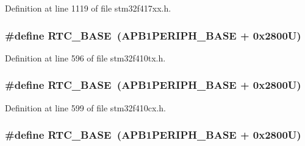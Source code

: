 Definition at line 1119 of file stm32f417xx.\+h.

\subsubsection[{\texorpdfstring{R\+T\+C\+\_\+\+B\+A\+SE}{RTC_BASE}}]{\setlength{\rightskip}{0pt plus 5cm}\#define R\+T\+C\+\_\+\+B\+A\+SE~({\bf A\+P\+B1\+P\+E\+R\+I\+P\+H\+\_\+\+B\+A\+SE} + 0x2800\+U)}\hypertarget{group___peripheral__registers__structures_ga4265e665d56225412e57a61d87417022}{}\label{group___peripheral__registers__structures_ga4265e665d56225412e57a61d87417022}


Definition at line 596 of file stm32f410tx.\+h.

\subsubsection[{\texorpdfstring{R\+T\+C\+\_\+\+B\+A\+SE}{RTC_BASE}}]{\setlength{\rightskip}{0pt plus 5cm}\#define R\+T\+C\+\_\+\+B\+A\+SE~({\bf A\+P\+B1\+P\+E\+R\+I\+P\+H\+\_\+\+B\+A\+SE} + 0x2800\+U)}\hypertarget{group___peripheral__registers__structures_ga4265e665d56225412e57a61d87417022}{}\label{group___peripheral__registers__structures_ga4265e665d56225412e57a61d87417022}


Definition at line 599 of file stm32f410cx.\+h.

\subsubsection[{\texorpdfstring{R\+T\+C\+\_\+\+B\+A\+SE}{RTC_BASE}}]{\setlength{\rightskip}{0pt plus 5cm}\#define R\+T\+C\+\_\+\+B\+A\+SE~({\bf A\+P\+B1\+P\+E\+R\+I\+P\+H\+\_\+\+B\+A\+SE} + 0x2800\+U)}\hypertarget{group___peripheral__registers__structures_ga4265e665d56225412e57a61d87417022}{}\label{group___peripheral__registers__structures_ga4265e665d56225412e57a61d87417022}



